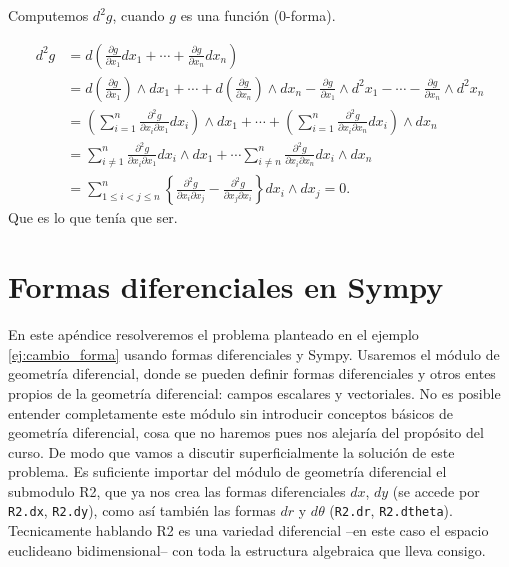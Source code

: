 \begin{subappendices}
\begin{ejemplo} Computemos $d^2g$, cuando $g$ es una función (0-forma).

\[
\begin{split}
d^2g&=d\left(\frac{\partial g}{\partial x_1}dx_1+\cdots+\frac{\partial g}{\partial x_n}dx_n\right)\\
&= d\left(\frac{\partial g}{\partial x_1}\right)\wedge dx_1+\cdots+d\left(\frac{\partial g}{\partial x_n}\right)\wedge dx_n
    -\frac{\partial g}{\partial x_1}\wedge d^2x_1-\cdots-\frac{\partial g}{\partial x_n}\wedge d^2x_n\\
    &=\left(\sum_{i=1}^n\frac{\partial^2g}{\partial x_i\partial x_1} dx_i\right)\wedge dx_1+\cdots+\left(\sum_{i=1}^n\frac{\partial^2g}{\partial x_i\partial x_n} dx_i\right)\wedge dx_n\\
    &= \sum_{i\neq 1}^n\frac{\partial^2g}{\partial x_i\partial x_1} dx_i\wedge dx_1+\cdots
    \sum_{i\neq n}^n\frac{\partial^2g}{\partial x_i\partial x_n} dx_i\wedge dx_n\\
    &=\sum_{1\leq i<j\leq n}^n\left\{\frac{\partial^2g}{\partial x_i\partial x_j}- \frac{\partial^2g}{\partial x_j\partial x_i}\right \} dx_i\wedge dx_j=0.
\end{split}
\]
Que es lo que tenía que ser.


\end{ejemplo}

\section{Formas diferenciales en Sympy}

En este apéndice resolveremos el problema planteado en el ejemplo \ref{ej:cambio_forma} usando formas diferenciales y Sympy.  Usaremos el módulo de geometría diferencial, donde se pueden definir formas diferenciales
y otros entes propios de la geometría diferencial: campos escalares  y
vectoriales. No es posible entender completamente este módulo sin introducir conceptos básicos de geometría diferencial, cosa que no haremos pues nos alejaría del propósito del curso. De modo que vamos a discutir superficialmente la solución de este problema.  Es suficiente importar del módulo de geometría diferencial el submodulo R2, que ya nos
crea las formas diferenciales $dx$, $dy$  (se accede por \texttt{R2.dx}, \texttt{R2.dy}), como
así también las formas $dr$ y $d\theta$ (\texttt{R2.dr}, \texttt{R2.dtheta}). Tecnicamente hablando R2 es una variedad diferencial --en este caso el espacio euclideano bidimensional-- con toda la estructura algebraica que lleva consigo.


\end{subappendices}
